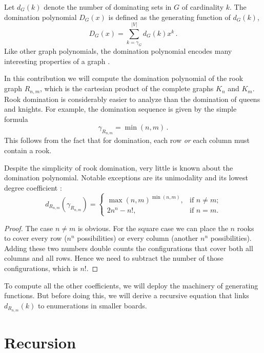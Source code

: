 \documentclass[12pt,reqno]{article}
\begin{document}
Let $d_G(k)$ denote the number of dominating sets in $G$ of
cardinality $k$. The domination polynomial $D_G(x)$ is defined as the
generating function of $d_G(k)$,
\begin{equation}
  \label{eq:def-D_G}
  D_G(x) = \sum_{k=\gamma_G}^{|V|}  d_G(k) x^k\,. 
\end{equation}
Like other graph polynomials, the domination polynomial encodes
many interesting properties of a graph \cite{akbari:alikhani:peng:10,alikhani:peng:14}. 

In this contribution we will compute the domination polynomial of the
rook graph $R_{n,m}$, which is the cartesian product of the complete
graphs $K_n$ and $K_m$.  Rook domination is considerably easier to
analyze than the domination of queens and knights. For example, the
domination sequence is given by the simple formula
\begin{equation}
  \label{eq:gamma-rook}
  \gamma_{R_{n,m}} = \min(n, m)\,.
\end{equation}
This follows from the fact that for domination, each row \emph{or}
each column must contain a rook.

Despite the simplicity of rook domination, very little is known about
the domination polynomial. Notable exceptions are its unimodality 
\cite{burcroff:obrien:23} and its lowest degree coefficient
\cite[problem 34b]{yaglom:yaglom:64}:
\begin{equation}
  \label{eq:R-gamma}
  d_{R_{n,m}}(\gamma_{R_{n,m}}) = \begin{cases}
    \max(n,m)^{\min(n,m)}, & \text{if $n \neq m$;}\\
    2n^n-n!, & \text{if $n = m$.}
    \end{cases}
  \end{equation}
  \begin{proof}
The case $n \neq m$ is obvious. For the square case we can place the
$n$ rooks to cover every row  ($n^n$ possibilities) or every column
(another $n^n$ possibilities). Adding these two numbers double counts
the configurations that cover both all columns and all rows. Hence we
need to subtract the number of those configurations, which is $n!$.
\end{proof}
To compute all the other coefficients, we will deploy the machinery of
generating functions. But before doing this, we will derive
a recursive equation that links $d_{R_{n,m}}(k)$ to enumerations in smaller
boards. 

\section{Recursion}
\end{document}
